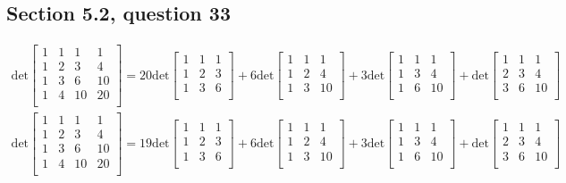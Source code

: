 \documentclass[a4paper,11pt]{article}
\begin{document}
\subsection*{Section 5.2, question 33}
\begin{align}
\text{det}
\begin{bmatrix}
1 & 1 & 1 & 1 \\
1 & 2 & 3 & 4 \\
1 & 3 & 6 & 10 \\
1 & 4 & 10 & 20 \\
\end{bmatrix}
=
20\text{det}
\begin{bmatrix}
1 & 1 & 1  \\
1 & 2 & 3  \\
1 & 3 & 6  \\ 
\end{bmatrix}
+
6\text{det}
\begin{bmatrix}
1 & 1 & 1 \\
1 & 2 & 4 \\
1 & 3 & 10 \\
\end{bmatrix}
+
3\text{det}
\begin{bmatrix}
1 & 1 & 1 \\
1 & 3 & 4 \\
1 & 6 & 10 \\
\end{bmatrix}
+
\text{det}
\begin{bmatrix}
1 & 1 & 1 \\
2 & 3 & 4 \\
3 & 6 & 10 \\
\end{bmatrix}
\end{align}
\begin{align}
\text{det}
\begin{bmatrix}
1 & 1 & 1 & 1 \\
1 & 2 & 3 & 4 \\
1 & 3 & 6 & 10 \\
1 & 4 & 10 & 20 \\
\end{bmatrix}
=
19\text{det}
\begin{bmatrix}
1 & 1 & 1  \\
1 & 2 & 3  \\
1 & 3 & 6  \\ 
\end{bmatrix}
+
6\text{det}
\begin{bmatrix}
1 & 1 & 1 \\
1 & 2 & 4 \\
1 & 3 & 10 \\
\end{bmatrix}
+
3\text{det}
\begin{bmatrix}
1 & 1 & 1 \\
1 & 3 & 4 \\
1 & 6 & 10 \\
\end{bmatrix}
+
\text{det}
\begin{bmatrix}
1 & 1 & 1 \\
2 & 3 & 4 \\
3 & 6 & 10 \\
\end{bmatrix}
\end{align}
\end{document}
